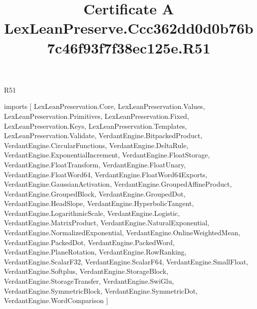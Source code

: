 \begin{lexlean}{R51}
\title{Certificate A LexLeanPreserve.Ccc362dd0d0b76b7c46f93f7f38ec125e.R51}
\begin{coremodule}
imports [
  LexLeanPreservation.Core,
  LexLeanPreservation.Values,
  LexLeanPreservation.Primitives,
  LexLeanPreservation.Fixed,
  LexLeanPreservation.Keys,
  LexLeanPreservation.Templates,
  LexLeanPreservation.Validate,
  VerdantEngine.BitpackedProduct,
  VerdantEngine.CircularFunctions,
  VerdantEngine.DeltaRule,
  VerdantEngine.ExponentialIncrement,
  VerdantEngine.FloatStorage,
  VerdantEngine.FloatTransform,
  VerdantEngine.FloatUnary,
  VerdantEngine.FloatWord64,
  VerdantEngine.FloatWord64Exports,
  VerdantEngine.GaussianActivation,
  VerdantEngine.GroupedAffineProduct,
  VerdantEngine.GroupedBlock,
  VerdantEngine.GroupedDot,
  VerdantEngine.HeadSlope,
  VerdantEngine.HyperbolicTangent,
  VerdantEngine.LogarithmicScale,
  VerdantEngine.Logistic,
  VerdantEngine.MatrixProduct,
  VerdantEngine.NaturalExponential,
  VerdantEngine.NormalizedExponential,
  VerdantEngine.OnlineWeightedMean,
  VerdantEngine.PackedDot,
  VerdantEngine.PackedWord,
  VerdantEngine.PlaneRotation,
  VerdantEngine.RowRanking,
  VerdantEngine.ScalarF32,
  VerdantEngine.ScalarF64,
  VerdantEngine.SmallFloat,
  VerdantEngine.Softplus,
  VerdantEngine.StorageBlock,
  VerdantEngine.StorageTransfer,
  VerdantEngine.SwiGlu,
  VerdantEngine.SymmetricBlock,
  VerdantEngine.SymmetricDot,
  VerdantEngine.WordComparison
]


\end{coremodule}
\end{lexlean}
